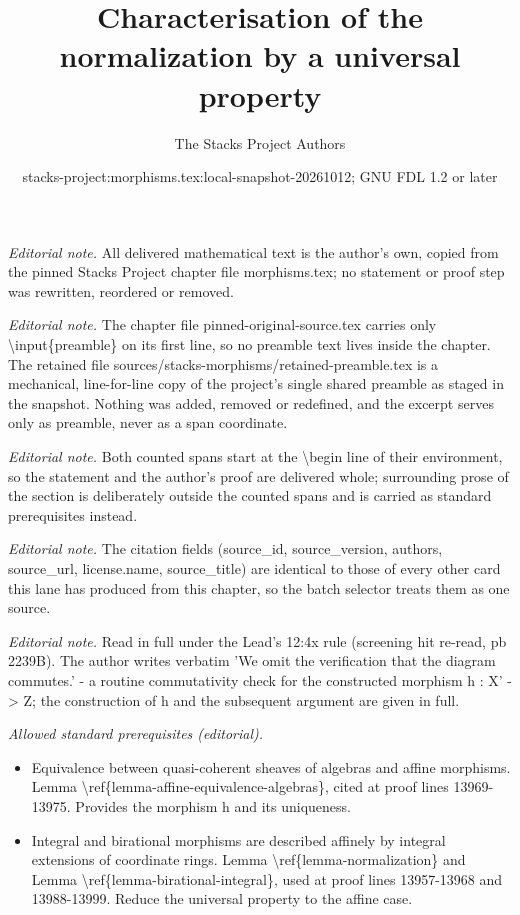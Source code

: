 \documentclass[10pt,a4paper]{amsart}
\title{Characterisation of the normalization by a universal property}
\author{The Stacks Project Authors}
\date{stacks-project:morphisms.tex:local-snapshot-20261012; GNU FDL 1.2 or later}
\theoremstyle{plain}
\theoremstyle{definition}
\theoremstyle{remark}
\numberwithin{equation}{subsection}
\begin{document}
\maketitle
\setcounter{subsection}{1}
\noindent\textit{Editorial note.} All delivered mathematical text is the author's own, copied from the pinned Stacks Project chapter file morphisms.tex; no statement or proof step was rewritten, reordered or removed.\par\medskip
\noindent\textit{Editorial note.} The chapter file pinned-original-source.tex carries only \textbackslash{}input\{preamble\} on its first line, so no preamble text lives inside the chapter. The retained file sources/stacks-morphisms/retained-preamble.tex is a mechanical, line-for-line copy of the project's single shared preamble as staged in the snapshot. Nothing was added, removed or redefined, and the excerpt serves only as preamble, never as a span coordinate.\par\medskip
\noindent\textit{Editorial note.} Both counted spans start at the \textbackslash{}begin line of their environment, so the statement and the author's proof are delivered whole; surrounding prose of the section is deliberately outside the counted spans and is carried as standard prerequisites instead.\par\medskip
\noindent\textit{Editorial note.} The citation fields (source\_id, source\_version, authors, source\_url, license.name, source\_title) are identical to those of every other card this lane has produced from this chapter, so the batch selector treats them as one source.\par\medskip
\noindent\textit{Editorial note.} Read in full under the Lead's 12:4x rule (screening hit re-read, pb 2239B). The author writes verbatim 'We omit the verification that the diagram commutes.' - a routine commutativity check for the constructed morphism h : X' -> Z; the construction of h and the subsequent argument are given in full.\par\medskip
\noindent\textit{Allowed standard prerequisites (editorial).}\begin{itemize}
\item Equivalence between quasi-coherent sheaves of algebras and affine morphisms. Lemma \textbackslash{}ref\{lemma-affine-equivalence-algebras\}, cited at proof lines 13969-13975. Provides the morphism h and its uniqueness.
\item Integral and birational morphisms are described affinely by integral extensions of coordinate rings. Lemma \textbackslash{}ref\{lemma-normalization\} and Lemma \textbackslash{}ref\{lemma-birational-integral\}, used at proof lines 13957-13968 and 13988-13999. Reduce the universal property to the affine case.
\end{itemize}\medskip
\end{document}
